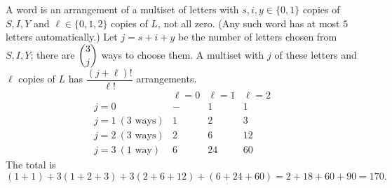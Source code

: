 A word is an arrangement of a multiset of letters with $s,i,y\in\{0,1\}$ copies of $S,I,Y$ and $\ell\in\{0,1,2\}$ copies of $L$, not all zero. (Any such word has at most $5$ letters automatically.) Let $j=s+i+y$ be the number of letters chosen from $S,I,Y$; there are $\dbinom3j$ ways to choose them. A multiset with $j$ of these letters and $\ell$ copies of $L$ has $\dfrac{(j+\ell)!}{\ell!}$ arrangements.
\[
\begin{array}{c|ccc}
 & \ell=0 & \ell=1 & \ell=2\\ \hline
j=0 & - & 1 & 1\\
j=1\ (3\text{ ways}) & 1 & 2 & 3\\
j=2\ (3\text{ ways}) & 2 & 6 & 12\\
j=3\ (1\text{ way}) & 6 & 24 & 60
\end{array}
\]
The total is
\[
(1+1)+3(1+2+3)+3(2+6+12)+(6+24+60)=2+18+60+90=\boxed{170}.
\]
